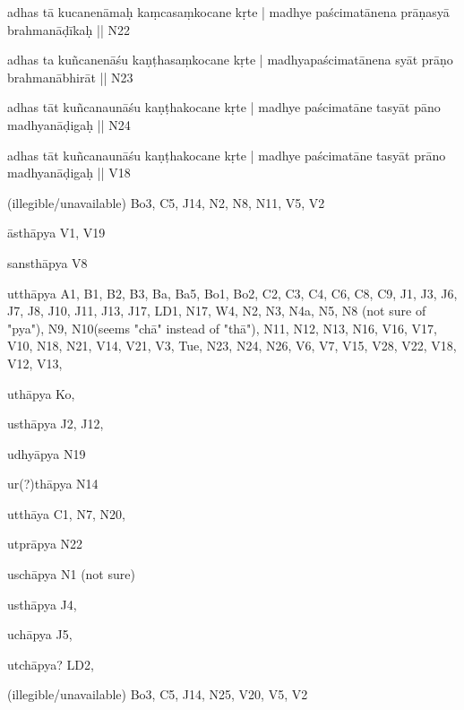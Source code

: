 \begin{ekdosis}
\begin{marma}[hp01_055]
\begin{marma}[hp02_009]
\begin{marma}[hp02_011]
\begin{marma}[hp02_46]
      \item[adhas tā kucanenāmaḥ kaṃcasaṃkocane kṛte | madhye paścimatānena prāṇasyā brahmanāḍīkaḥ ||] N22
      \item[adhas ta kuñcanenāśu kaṇṭhasaṃkocane kṛte | madhyapaścimatānena syāt prāṇo brahmanābhirāt ||] N23
      \item[adhas tāt kuñcanaunāśu kaṇṭhakocane kṛte | madhye paścimatāne tasyāt pāno madhyanāḍigaḥ ||] N24
      \item[adhas tāt kuñcanaunāśu kaṇṭhakocane kṛte | madhye paścimatāne tasyāt prāno madhyanāḍigaḥ ||] V18
      \item[(illegible/unavailable)] Bo3, C5, J14, N2, N8, N11, V5, V2
        \begin{description}

        \end{description}
      \end{marma}

      \begin{marma}[hp02_48b]
      \item[āsthāpya] V1, V19
      \item[sansthāpya] V8
      \item[utthāpya] A1, B1, B2, B3, Ba, Ba5, Bo1, Bo2, C2, C3, C4, C6, C8, C9, J1, J3, J6, J7, J8, J10, J11, J13, J17, LD1, N17, W4, N2, N3, N4a, N5, N8 (not sure of "pya"), N9, N10(seems "chā" instead of "thā"), N11, N12, N13, N16, V16, V17, V10, N18, N21, V14, V21, V3, Tue, N23, N24, N26, V6, V7, V15, V28, V22, V18, V12, V13,
      \item[uthāpya] Ko,
      \item[usthāpya] J2, J12, 
      \item[udhyāpya] N19
      \item[ur(?)thāpya] N14
      \item[utthāya] C1, N7, N20,
      \item[utprāpya] N22
      \item[uschāpya] N1 (not sure)
      \item[usthāpya] J4,
      \item[uchāpya] J5,
      \item[utchāpya?] LD2,
      \item[(illegible/unavailable)] Bo3, C5, J14, N25, V20, V5, V2

        \begin{description}

        \end{description}
      \end{marma}


\end{marma}
\end{marma}
\end{marma}
\end{ekdosis}

